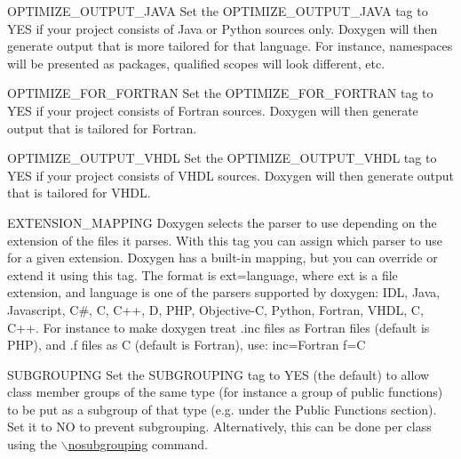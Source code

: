 \begin{DoxyDescription}
\label{config_cfg_optimize_output_java}
\hypertarget{config_cfg_optimize_output_java}{}
 
\item[{\ttfamily OPTIMIZE\_\-OUTPUT\_\-JAVA} ] Set the OPTIMIZE\_\-OUTPUT\_\-JAVA tag to YES if your project consists of Java or Python sources only. Doxygen will then generate output that is more tailored for that language. For instance, namespaces will be presented as packages, qualified scopes will look different, etc.

\label{config_cfg_optimize_for_fortran}
\hypertarget{config_cfg_optimize_for_fortran}{}
 
\item[{\ttfamily OPTIMIZE\_\-FOR\_\-FORTRAN} ] Set the {\ttfamily OPTIMIZE\_\-FOR\_\-FORTRAN} tag to {\ttfamily YES} if your project consists of Fortran sources. Doxygen will then generate output that is tailored for Fortran.

\label{config_cfg_optimize_output_vhdl}
\hypertarget{config_cfg_optimize_output_vhdl}{}
 
\item[{\ttfamily OPTIMIZE\_\-OUTPUT\_\-VHDL} ] Set the {\ttfamily OPTIMIZE\_\-OUTPUT\_\-VHDL} tag to {\ttfamily YES} if your project consists of VHDL sources. Doxygen will then generate output that is tailored for VHDL.

\label{config_cfg_extension_mapping}
\hypertarget{config_cfg_extension_mapping}{}
 
\item[{\ttfamily EXTENSION\_\-MAPPING} ] Doxygen selects the parser to use depending on the extension of the files it parses. With this tag you can assign which parser to use for a given extension. Doxygen has a built-\/in mapping, but you can override or extend it using this tag. The format is ext=language, where ext is a file extension, and language is one of the parsers supported by doxygen: IDL, Java, Javascript, C\#, C, C++, D, PHP, Objective-\/C, Python, Fortran, VHDL, C, C++. For instance to make doxygen treat .inc files as Fortran files (default is PHP), and .f files as C (default is Fortran), use: inc=Fortran f=C

\label{config_cfg_subgrouping}
\hypertarget{config_cfg_subgrouping}{}
 
\item[{\ttfamily SUBGROUPING} ] Set the {\ttfamily SUBGROUPING} tag to {\ttfamily YES} (the default) to allow class member groups of the same type (for instance a group of public functions) to be put as a subgroup of that type (e.g. under the Public Functions section). Set it to {\ttfamily NO} to prevent subgrouping. Alternatively, this can be done per class using the \hyperlink{commands_cmdnosubgrouping}{$\backslash$nosubgrouping} command.


\end{DoxyDescription}
